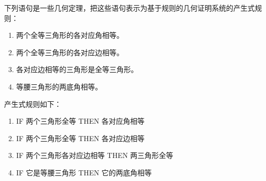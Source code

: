 \begin{question}
下列语句是一些几何定理，把这些语句表示为基于规则的几何证明系统的产生式规则：
	\begin{enumerate}
		\item 两个全等三角形的各对应角相等。
		\item 两个全等三角形的各对应边相等。 
		\item 各对应边相等的三角形是全等三角形。
		\item 等腰三角形的两底角相等。 
	\end{enumerate}
\end{question}
\begin{solution}
产生式规则如下：
	\begin{enumerate}
		\item IF 两个三角形全等 THEN 各对应角相等 
		\item IF 两个三角形全等 THEN 各对应边相等 
		\item IF 两个三角形各对应边相等 THEN 两三角形全等 
		\item IF 它是等腰三角形 THEN 它的两底角相等
	\end{enumerate}
\end{solution}